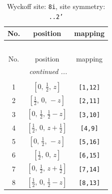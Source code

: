 \documentclass[fleqn,8pt]{jsarticle}
\begin{document}
\begin{longtable}{ccc}
\caption{Wyckoff site: {\tt 8i}, site symmetry: {\tt ..2'}}
 \\
 \hline \hline
No. & position & mapping \\ \hline \endfirsthead

\multicolumn{2}{l}{\tablename\ \thetable{}} \\
 \hline \hline
No. & position & mapping \\ \hline \endhead

 \hline \hline
\multicolumn{2}{r}{\footnotesize\it continued ...} \\ \endfoot

 \hline \hline
\multicolumn{2}{r}{} \\ \endlastfoot

1 & $\left[ 0,\, \frac{1}{2},\, z \right]$ & {\tt [1,12]} \\ \hline
2 & $\left[ \frac{1}{2},\, 0,\, - z \right]$ & {\tt [2,11]} \\ \hline
3 & $\left[ 0,\, \frac{1}{2},\, \frac{1}{2} - z \right]$ & {\tt [3,10]} \\ \hline
4 & $\left[ \frac{1}{2},\, 0,\, z + \frac{1}{2} \right]$ & {\tt [4,9]} \\ \hline
5 & $\left[ 0,\, \frac{1}{2},\, - z \right]$ & {\tt [5,16]} \\ \hline
6 & $\left[ \frac{1}{2},\, 0,\, z \right]$ & {\tt [6,15]} \\ \hline
7 & $\left[ 0,\, \frac{1}{2},\, z + \frac{1}{2} \right]$ & {\tt [7,14]} \\ \hline
8 & $\left[ \frac{1}{2},\, 0,\, \frac{1}{2} - z \right]$ & {\tt [8,13]} \\
\end{longtable}
\renewcommand{\arraystretch}{1.2}
\end{document}
